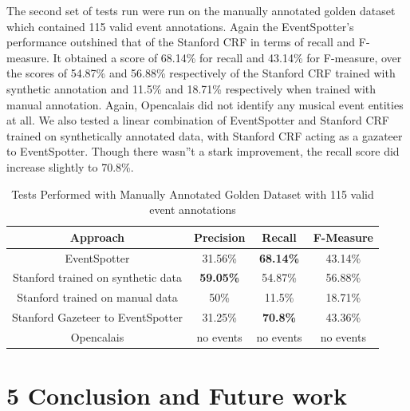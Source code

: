 \documentclass[a4paper,11pt]{report}
\begin{document}
The second set of tests run were run on the manually annotated golden dataset which contained 115 valid event annotations. Again the EventSpotter's performance outshined that of the Stanford CRF in terms of recall and F-measure. It obtained a score of 68.14\% for recall and 43.14\% for F-measure, over the scores of 54.87\% and 56.88\% respectively of the Stanford CRF trained with synthetic annotation and 11.5\% and 18.71\% respectively when trained with manual annotation. Again, Opencalais did not identify any musical event entities at all. We also tested a linear combination of EventSpotter and Stanford CRF trained on synthetically annotated data, with Stanford CRF acting as a gazateer to EventSpotter. Though there wasn''t a stark improvement, the recall score did increase slightly to 70.8\%.
\begin{table}
\caption{Tests Performed with Manually Annotated Golden Dataset with 115 valid event annotations} %
\centering %
\begin{tabular}{c c c c} %
\hline\hline %
Approach & Precision & Recall & F-Measure \\ [0.5ex] %
\hline %
EventSpotter & 31.56\% & \bf 68.14\% \bf & 43.14\% \\
Stanford trained on synthetic data & \bf 59.05\% \bf & 54.87\% & 56.88\%\\
Stanford trained on manual data & 50\% & 11.5\% & 18.71\% \\
Stanford Gazeteer to EventSpotter & 31.25\% & \bf 70.8\% \bf & 43.36\% \\
Opencalais & no events & no events & no events \\
\hline %
\end{tabular}
\label{table:nonlin} %
\end{table}

\chapter*{5 Conclusion and Future work}
\end{document}
